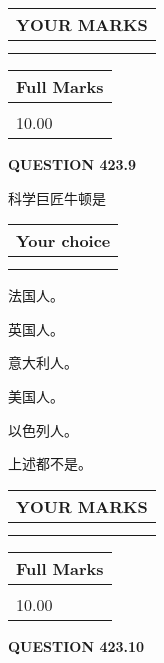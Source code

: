 \documentclass{ctexart}
\begin{document}
\vspace{0.2in}
  
\noindent\begin{tabular}{|l|}
\hline
 YOUR MARKS  \\
\hline
 \\ 
 \\ 
\hline
\end{tabular}
\hspace{0.05in} \begin{tabular}{|l|}
\hline
 Full Marks  \\
\hline
 \\ 
10.00 \\
\hline
\end{tabular}
{\textbf{\Large{QUESTION
423.9 
}}}
  
  
科学巨匠牛顿是
  
  
\noindent\hspace{3.0in} \begin{tabular}{|l|}
\hline
Your choice \\
\hline
 \\ 
 \\ 
\hline
\end{tabular}
  
  
 
 
法国人。
 
 
英国人。
 
 
意大利人。
 
 
美国人。
 
 
以色列人。
 
 
 上述都不是。
 
 
  
\vspace{0.2in}
  
\noindent\begin{tabular}{|l|}
\hline
 YOUR MARKS  \\
\hline
 \\ 
 \\ 
\hline
\end{tabular}
\hspace{0.05in} \begin{tabular}{|l|}
\hline
 Full Marks  \\
\hline
 \\ 
10.00 \\
\hline
\end{tabular}
{\textbf{\Large{QUESTION
423.10 
}}}
  
\end{document}
